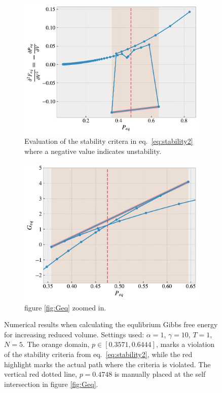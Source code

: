 \documentclass[reprint, amsmath, amssymb, aps, onecolumn]{revtex4-2}
\begin{document}
\begin{figure}[H]
     \begin{subfigure}[b]{0.49\textwidth}
         \centering
         \includegraphics[width=\textwidth]{figures/ddFddV.pdf}
         \caption{Evaluation of the stability critera in eq.~\eqref{eq:stability2} where a negative value indicates unstability.}
         \label{fig:dPdV}
     \end{subfigure}
     \begin{subfigure}[b]{0.49\textwidth}
         \centering
         \includegraphics[width=\textwidth]{figures/Geq_zoom.pdf}
         \caption{figure \ref{fig:Geq} zoomed in.}
         \label{fig:Geq_zoom}
     \end{subfigure}
     \caption{Numerical results when calculating the equlibrium Gibbs free energy for increasing reduced volume. Settings used: $\alpha = 1$, $\gamma = 10$, $T = 1$, $N = 5$. The orange domain, $p \in [0.3571, 0.6444]$, marks a violation of the stability criteria from eq.~\eqref{eq:stability2}, while the red highlight marks the actual path where the criteria is violated. The vertical red dotted line, $p = 0.4748$ is manually placed at the self intersection in figure \ref{fig:Geq}.}
     \label{fig:res2}
\end{figure}
\end{document}
